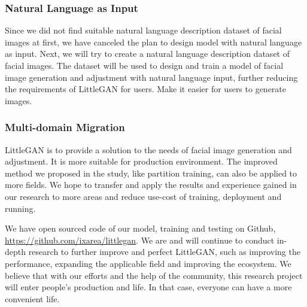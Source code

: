 \subsubsection*{Natural Language as Input}

Since we did not find suitable natural language description dataset of facial images at first,
    we have canceled the plan to design model with natural language as input.
Next, we will try to create a natural language description dataset of facial images.
The dataset will be used to design and train a model of facial image generation and adjustment with natural language input,
    further reducing the requirements of LittleGAN for users.
Make it easier for users to generate images.


\subsubsection*{Multi-domain Migration}

LittleGAN is to provide a solution to the needs of facial image generation and adjustment.
It is more suitable for production environment.
The improved method we proposed in the study, like partition training, can also be applied to more fields.
We hope to transfer and apply the results and experience gained in our research to more areas and reduce use-cost of training, deployment and running.


\vspace{4ex}

We have open sourced code of our model, training and testing on Github, \url{https://github.com/ixarea/littlegan}.
We are and will continue to conduct in-depth research to further improve and perfect LittleGAN,
    such as improving the performance, expanding the applicable field and improving the ecosystem.
We believe that with our efforts and the help of the community,
    this research project will enter people's production and life.
In that case, everyone can have a more convenient life.






